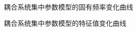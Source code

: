 \begin{figure}[!htb]
  \centering
  \caption{耦合系统集中参数模型的固有频率变化曲线}\label{Lumped-Frequency-Curve}
\end{figure}

\begin{figure}[!htb]
  \centering
  \caption{耦合系统集中参数模型的特征值变化曲线}\label{Lumped-Max-Eigen-Curve}
\end{figure}












